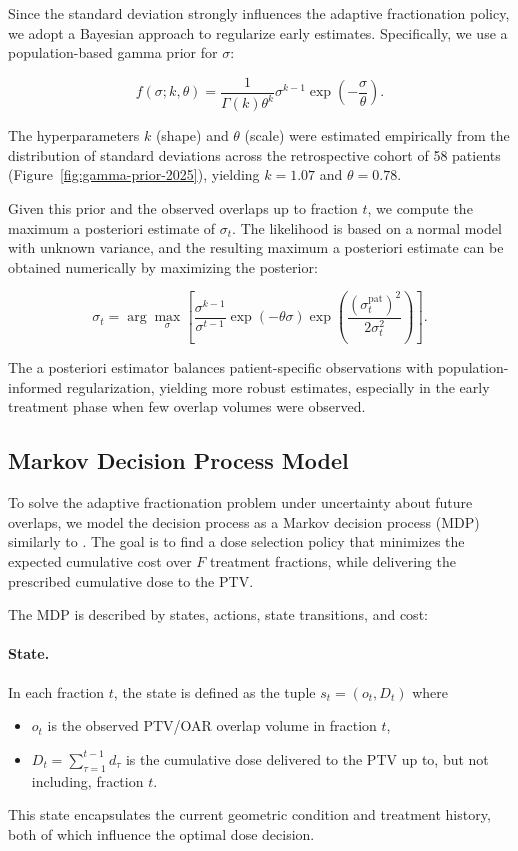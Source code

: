 \documentclass[11pt]{article}
\begin{document}
Since the standard deviation strongly influences the adaptive fractionation policy, we adopt a Bayesian approach to regularize early estimates. Specifically, we use a population-based gamma prior for $\sigma$:

\begin{equation}
f(\sigma; k, \theta) = \frac{1}{\Gamma(k)\theta^k}\sigma^{k-1}\exp\left(-\frac{\sigma}{\theta}\right).
\label{eq:gamma-prior-overlap}
\end{equation}

The hyperparameters $k$ (shape) and $\theta$ (scale) were estimated empirically from the distribution of standard deviations across the retrospective cohort of 58 patients (Figure~\ref{fig:gamma-prior-2025}), yielding $k=1.07$ and $\theta=0.78$.

Given this prior and the observed overlaps up to fraction $t$, we compute the maximum a posteriori estimate of $\sigma_t$. The likelihood is based on a normal model with unknown variance, and the resulting maximum a posteriori estimate can be obtained numerically by maximizing the posterior:

\begin{equation}
\sigma_t = \arg\max_{\sigma}\left[\frac{\sigma^{k-1}}{\sigma^{t-1}} \exp(-\theta \sigma)\exp\left(\frac{(\sigma_t^{\mathrm{pat}})^2}{2\sigma_t^2}\right)\right].
\label{eq:sigma-map-overlap}
\end{equation}

The a posteriori estimator balances patient-specific observations with population-informed regularization, yielding more robust estimates, especially in the early treatment phase when few overlap volumes were observed.

\subsection{Markov Decision Process Model}

To solve the adaptive fractionation problem under uncertainty about future overlaps, we model the decision process as a Markov decision process (MDP) similarly to \cite{ref13}. The goal is to find a dose selection policy that minimizes the expected cumulative cost over $F$ treatment fractions, while delivering the prescribed cumulative dose to the PTV.

The MDP is described by states, actions, state transitions, and cost:

\paragraph{State.}
In each fraction $t$, the state is defined as the tuple $s_t = (o_t, D_t)$ where
\begin{itemize}
\item $o_t$ is the observed PTV/OAR overlap volume in fraction $t$,
\item $D_t = \sum_{\tau=1}^{t-1} d_{\tau}$ is the cumulative dose delivered to the PTV up to, but not including, fraction $t$.
\end{itemize}
This state encapsulates the current geometric condition and treatment history, both of which influence the optimal dose decision.
\end{document}
